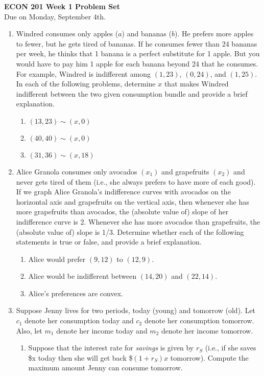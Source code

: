 \documentclass[11pt]{article}
\begin{document}
\begin{center}
\textbf{ECON 201 Week 1 Problem Set}\\
Due on Monday, September 4th.
\end{center}

\begin{enumerate}
\item Windred consumes only apples ($a$) and bananas ($b$). He prefers more apples to fewer, but he gets tired of bananas. If he consumes fewer than 24 bananas per week, he thinks that 1 banana is a perfect substitute for 1 apple. But you would have to pay him 1 apple for each banana beyond 24 that he consumes. For example, Windred is indifferent among $(1,23)$, $(0,24)$, and $(1,25)$. In each of the following problems, determine $x$ that makes Windred indifferent between the two given consumption bundle and provide a brief explanation.
    \begin{enumerate}
        \item $(13,23)\sim (x,0)$
        \item $(40,40)\sim (x,0)$
        \item $(31,36)\sim (x,18)$
    \end{enumerate}

\item Alice Granola consumes only avocados $(x_{1})$ and grapefruits $(x_{2})$ and never gets tired of them (i.e., she always prefers to have more of each good). If we graph Alice Granola’s indifference curves with avocados on the horizontal axis and grapefruits on the vertical axis, then whenever she has more grapefruits than avocados, the (absolute value of) slope of her indifference curve is 2. Whenever she has more avocados than grapefruits, the (absolute value of) slope is 1/3. Determine whether each of the following statements is true or false, and provide a brief explanation.
    \begin{enumerate}
        \item Alice would prefer $(9,12)$ to $(12,9)$.
        \item Alice would be indifferent between $(14,20)$ and $(22,14)$.
        \item Alice's preferences are convex.
    \end{enumerate}

\item Suppose Jenny lives for two periods, today (young) and tomorrow (old). Let $c_{1}$ denote her consumption today and $c_{2}$ denote her consumption tomorrow. Also, let $m_{1}$ denote her income today and $m_{2}$ denote her income tomorrow.
    \begin{enumerate}
        \item Suppose that the interest rate for \emph{savings} is given by $r_{S}$ (i.e., if she saves \$x today then she will get back \$$(1+r_{S})x$ tomorrow). Compute the maximum amount Jenny can consume tomorrow.


\end{enumerate}
\end{enumerate}
\end{document}

